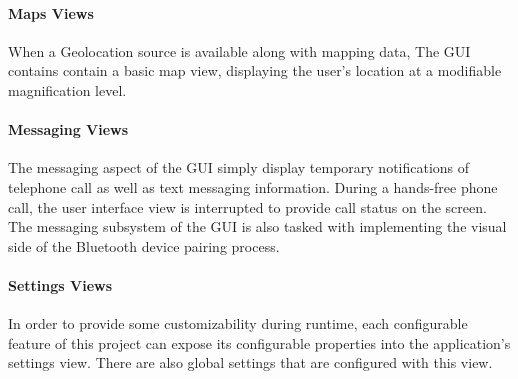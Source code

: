 \paragraph{Maps Views}
When a Geolocation source is available along with mapping data, The GUI contains contain a basic map view, displaying the user's location at a modifiable magnification level.

\paragraph{Messaging Views}
The messaging aspect of the GUI simply display temporary notifications of telephone call as well as text messaging information.
During a hands-free phone call, the user interface view is interrupted to provide call status on the screen.
The messaging subsystem of the GUI is also tasked with implementing the visual side of the Bluetooth device pairing process.

\paragraph{Settings Views}
In order to provide some customizability during runtime, each configurable feature of this project can expose its configurable properties into the application's settings view.
There are also global settings that are configured with this view.
